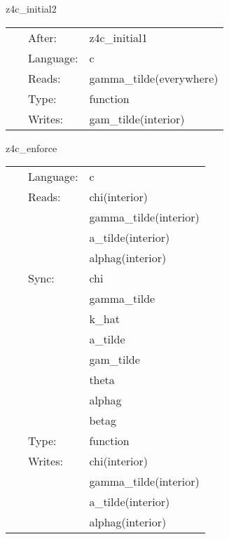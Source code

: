 \vspace{5mm}


\hspace{5mm} z4c\_initial2 

\hspace{5mm}{\it convert adm to z4c variables, part 2 } 


\hspace{5mm}

 \begin{tabular*}{160mm}{cll} 
~ & After:  & z4c\_initial1 \\ 
~ & Language:  & c \\ 
~ & Reads:  & gamma\_tilde(everywhere) \\ 
~ & Type:  & function \\ 
~ & Writes:  & gam\_tilde(interior) \\ 
\end{tabular*} 


\vspace{5mm}


\hspace{5mm} z4c\_enforce 

\hspace{5mm}{\it enforce algebraic z4c constraints } 


\hspace{5mm}

 \begin{tabular*}{160mm}{cll} 
~ & Language:  & c \\ 
~ & Reads:  & chi(interior) \\ 
~& ~ &gamma\_tilde(interior)\\ 
~& ~ &a\_tilde(interior)\\ 
~& ~ &alphag(interior)\\ 
~ & Sync:  & chi \\ 
~& ~ &gamma\_tilde\\ 
~& ~ &k\_hat\\ 
~& ~ &a\_tilde\\ 
~& ~ &gam\_tilde\\ 
~& ~ &theta\\ 
~& ~ &alphag\\ 
~& ~ &betag\\ 
~ & Type:  & function \\ 
~ & Writes:  & chi(interior) \\ 
~& ~ &gamma\_tilde(interior)\\ 
~& ~ &a\_tilde(interior)\\ 
~& ~ &alphag(interior)\\ 
\end{tabular*} 


